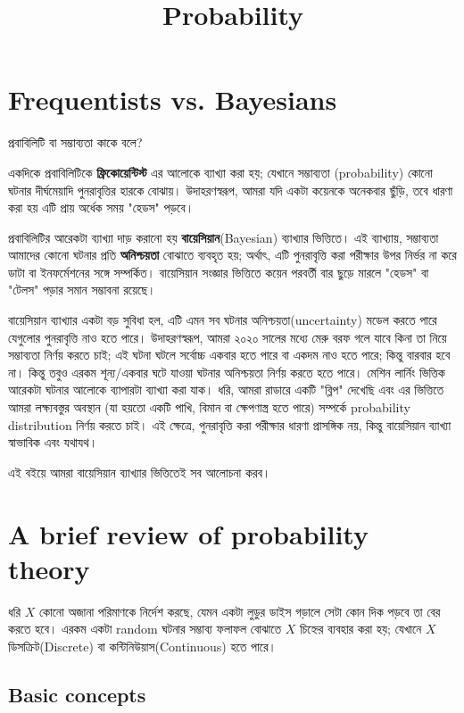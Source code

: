 \documentclass[graybox, envcountchap, twocolumn]{styles/svmult}
\begin{document}
\title{Probability}
{\bengalifont
\section{Frequentists vs. Bayesians}
প্রবাবিলিটি বা সম্ভাব্যতা কাকে বলে?

একদিকে প্রবাবিলিটিকে  \textbf{ফ্রিকোয়েন্টিস্ট} এর আলোকে ব্যাখ্যা করা হয়; যেখানে সম্ভাব্যতা (probability) কোনো ঘটনার দীর্ঘমেয়াদি পুনরাবৃত্তির হারকে বোঝায়। উদাহরণস্বরূপ, আমরা যদি একটা কয়েনকে অনেকবার ছুঁড়ি, তবে ধারণা করা হয় এটি প্রায় অর্ধেক সময় "হেডস" পড়বে।

প্রবাবিলিটির আরেকটা ব্যাখ্যা দাড় করানো হয় \textbf{বায়েসিয়ান}(Bayesian) ব্যাখ্যার ভিত্তিতে। এই ব্যাখ্যায়, সম্ভাব্যতা আমাদের কোনো ঘটনার প্রতি \textbf{অনিশ্চয়তা} বোঝাতে ব্যবহৃত হয়; অর্থাৎ, এটি পুনরাবৃত্তি করা পরীক্ষার উপর নির্ভর না করে ডাটা বা ইনফর্মেশনের সঙ্গে সম্পর্কিত। বায়েসিয়ান সংজ্ঞার ভিত্তিতে কয়েন পরবর্তী বার ছুড়ে মারলে "হেডস" বা "টেলস" পড়ার সমান সম্ভাবনা রয়েছে।    


বায়েসিয়ান ব্যাখ্যার একটা বড় সুবিধা হল, এটি এমন সব ঘটনার অনিশ্চয়তা(uncertainty) মডেল করতে পারে যেগুলোর পুনরাবৃত্তি নাও হতে পারে।  উদাহরণস্বরূপ, আমরা ২০২০ সালের মধ্যে মেরু বরফ গলে যাবে কিনা তা নিয়ে সম্ভাব্যতা নির্ণয় করতে চাই; এই ঘটনা ঘটলে সর্বোচ্চ একবার হতে পারে বা একদম নাও হতে পারে; কিন্তু বারবার হবে না। কিন্তু তবুও এরকম শূন্য/একবার ঘটে যাওয়া ঘটনার অনিশ্চয়তা নির্ণয় করতে হতে পারে। 
মেশিন লার্নিং ভিত্তিক আরেকটা ঘটনার আলোকে ব্যাপারটা ব্যাখ্যা করা যাক। ধরি,  আমরা রাডারে একটি "ব্লিপ" দেখেছি এবং এর ভিত্তিতে আমরা লক্ষ্যবস্তুর অবস্থান (যা হয়তো একটি পাখি, বিমান বা ক্ষেপণাস্ত্র হতে পারে) সম্পর্কে probability distribution নির্ণয় করতে চাই। এই ক্ষেত্রে, পুনরাবৃত্তি করা পরীক্ষার ধারণা প্রাসঙ্গিক নয়, কিন্তু বায়েসিয়ান ব্যাখ্যা স্বাভাবিক এবং যথাযথ।

এই বইয়ে আমরা বায়েসিয়ান ব্যাখ্যার ভিত্তিতেই সব আলোচনা করব। 




\section{A brief review of probability theory}
ধরি $𝑋$ কোনো অজানা পরিমাণকে নির্দেশ করছে, যেমন একটা লুডুর ডাইস গড়ালে সেটা কোন দিক পড়বে তা বের করতে হবে। এরকম একটা random ঘটনার সম্ভাব্য ফলাফল বোঝাতে $X$ চিহ্নের ব্যবহার করা হয়; যেখানে $X$ ডিসক্রিট(Discrete) বা কন্টিনিউয়াস(Continuous) হতে পারে।  

\subsection{Basic concepts}

}
\end{document}
